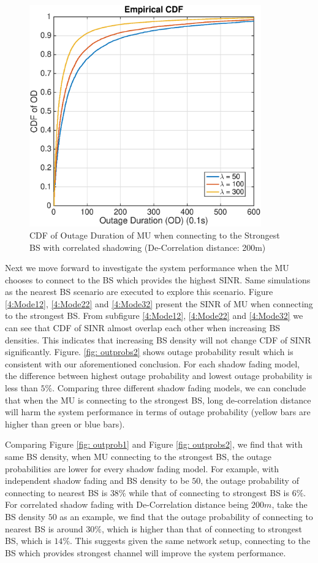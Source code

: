  \begin{figure}
 \centering
 \includegraphics[width=10cm]{ODthresh-5DeCorr200Max.eps}
 \caption{CDF of Outage Duration of MU when connecting to the Strongest BS with correlated shadowing (De-Correlation distance: 200m)}
 \label{corr2}
 \end{figure}
 \par Next we move forward to investigate the system performance when the MU chooses to connect to the BS which provides the highest SINR. Same simulations as the nearest BS scenario are executed to explore this scenario. Figure \ref{4:Mode12}, \ref{4:Mode22} and \ref{4:Mode32} present the SINR of MU when connecting to the strongest BS. From subfigure \ref{4:Mode12}, \ref{4:Mode22} and \ref{4:Mode32} we can see that CDF of SINR almost overlap each other when increasing BS densities. This indicates that increasing BS density will not change CDF of SINR significantly. Figure. \ref{fig: outprobs2} shows outage probability result which is consistent with our aforementioned conclusion. For each shadow fading model, the difference between highest outage probability and lowest outage probability is less than $5\%$. Comparing three different shadow fading models, we can conclude that when the MU is connecting to the strongest BS, long de-correlation distance will harm the system performance in terms of outage probability (yellow bars are higher than green or blue bars). 
 \par Comparing Figure \ref{fig: outprob1} and Figure \ref{fig: outprobs2}, we find that with same BS density, when MU connecting to the strongest BS, the outage probabilities are lower for every shadow fading model. For example, with independent shadow fading and BS density to be $50$, the outage probability of connecting to nearest BS is $38\%$ while that of connecting to strongest BS is $6\%$. For correlated shadow fading with De-Correlation distance being $200m$, take the BS density $50$ as an example, we find that the outage probability of connecting to nearest BS is around $30\%$, which is higher than that of connecting to strongest BS, which is $14\%$. This suggests given the same network setup, connecting to the BS which provides strongest channel will improve the system performance. 








